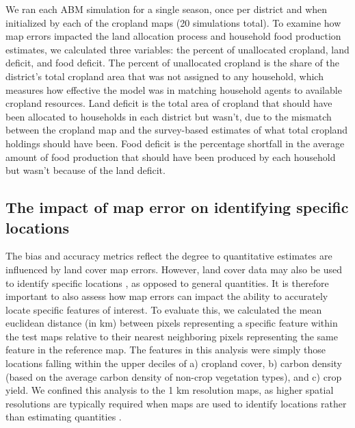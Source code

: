 \documentclass[a4paper]{article}
\begin{document}
We ran each ABM simulation for a single season, once per district and when initialized by each of the cropland maps (20 simulations total). 
To examine how map errors impacted the land allocation process and household food production estimates, we calculated three variables: the percent of unallocated cropland, land deficit, and food deficit. The percent of unallocated cropland is the share of the district's total cropland area that was not assigned to any household, which measures how effective the model was in matching household agents to available cropland resources. Land deficit is the total area of cropland that should have been allocated to households in each district but wasn't, due to the mismatch between the cropland map and the survey-based estimates of what total cropland holdings should have been. Food deficit is the percentage shortfall in the average amount of food production that should have been produced by each household but wasn't because of the land deficit. 

\vspace{-0.3 cm}
\subsection*{The impact of map error on identifying specific locations}
\vspace{-0.2 cm}
The bias and accuracy metrics reflect the degree to quantitative estimates are influenced by land cover map errors. However, land cover data may also be used to identify specific locations \citep[e.g. areas of high agricultural potential and low ecological cost;][]{estes_reconciling_2016}, as opposed to general quantities. It is therefore important to also assess how map errors can impact the ability to accurately locate specific features of interest. To evaluate this, we calculated the mean euclidean distance (in km) between pixels representing a specific feature within the test maps relative to their nearest neighboring pixels representing the same feature in the reference map. The features in this analysis were simply those locations falling within the upper deciles of a) cropland cover, b) carbon density (based on the average carbon density of non-crop vegetation types), and c) crop yield. We confined this analysis to the 1 km resolution maps, as higher spatial resolutions are typically required when maps are used to identify locations rather than estimating quantities \citep[e.g.][]{estes_reconciling_2016}.  

\vspace{-0.5 cm}
\end{document}
